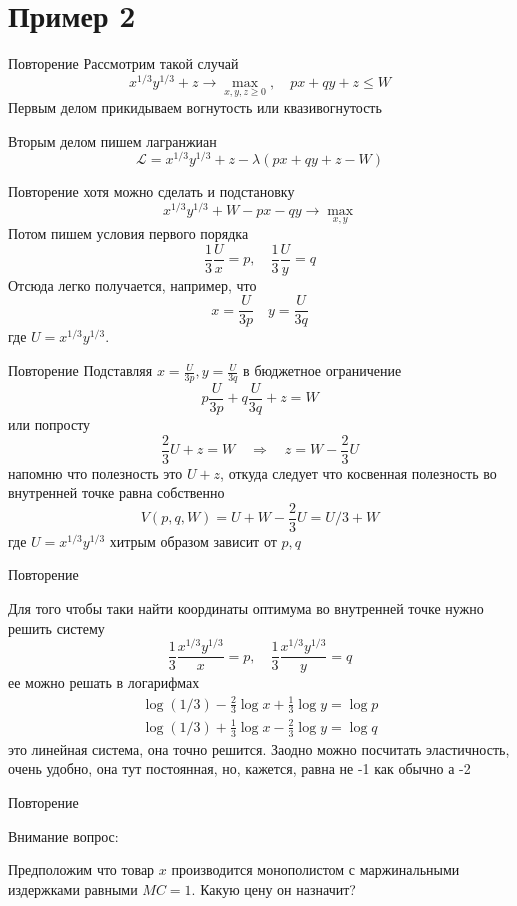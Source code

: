 \documentclass{beamer}
\begin{document}
\section{Пример 2}

\begin{frame}{Повторение}
Рассмотрим такой случай
$$ x^{1/3}y^{1/3} + z \to \max_{x,y,z \geqslant 0}, \quad px + qy + z \leqslant W$$
Первым делом прикидываем вогнутость или квазивогнутость

Вторым делом пишем лагранжиан
$$\mathcal{L} = x^{1/3}y^{1/3} + z - \lambda (px + qy + z - W)$$
\end{frame}

\begin{frame}{Повторение}
хотя можно сделать и подстановку
$$ x^{1/3}y^{1/3} + W - px - qy \to \max_{x,y}$$
Потом пишем условия первого порядка
$$ \frac{1}{3}\frac{U}{x} = p, \quad \frac{1}{3}\frac{U}{y} = q$$
Отсюда легко получается, например, что
$$ x = \frac{U}{3p} \quad y = \frac{U}{3q}$$
где $U =x^{1/3}y^{1/3}$.
\end{frame}

\begin{frame}{Повторение}
Подставляя $x = \frac{U}{3p}, y = \frac{U}{3q}$ в бюджетное ограничение
$$ p\frac{U}{3p} + q\frac{U}{3q} + z = W $$
или попросту
$$ \frac{2}{3}U + z = W \quad \Rightarrow \quad z = W - \frac{2}{3}U$$
напомню что полезность это $U+z$, откуда следует что косвенная полезность во внутренней точке равна собственно
$$ V(p,q,W) = U + W - \frac{2}{3}U = U/3 + W$$
где $U=x^{1/3}y^{1/3}$ хитрым образом зависит от $p,q$
\end{frame}

\begin{frame}{Повторение}

Для того чтобы таки найти координаты оптимума во внутренней точке нужно решить систему
$$ \frac{1}{3}\frac{x^{1/3}y^{1/3}}{x} = p, \quad \frac{1}{3}\frac{x^{1/3}y^{1/3}}{y} = q $$
ее можно решать в логарифмах
\begin{gather}
	\log(1/3) - \frac{2}{3} \log x + \frac{1}{3} \log y = \log p \\
	\log(1/3) + \frac{1}{3} \log x - \frac{2}{3} \log y = \log q
\end{gather}
это линейная система, она точно решится. Заодно можно посчитать эластичность, очень удобно, она тут постоянная, но, кажется, равна не -1 как обычно а -2
\end{frame}

\begin{frame}{Повторение}

Внимание вопрос: 

Предположим что товар $x$ производится монополистом с маржинальными издержками равными $MC = 1$. Какую цену он назначит?

\end{frame}
\end{document}
